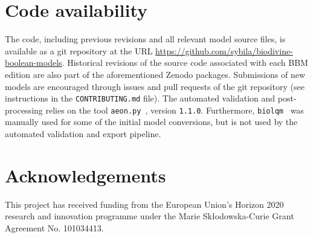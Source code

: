\documentclass[fleqn,10pt]{wlscirep}
\begin{document}
\section*{Code availability}

The code, including previous revisions and all relevant model source files, is available as a git repository at the URL \hyperlink{https://github.com/sybila/biodivine-boolean-models}{https://github.com/sybila/biodivine-boolean-models}. Historical revisions of the source code associated with each BBM edition are also part of the aforementioned Zenodo packages. Submissions of new models are encouraged through issues and pull requests of the git repository (see instructions in the \texttt{CONTRIBUTING.md} file). The automated validation and post-processing relies on the tool \texttt{aeon.py}~\cite{aeonpy}, version \texttt{1.1.0}. Furthermore, \texttt{biolqm}~\cite{biolqm} was manually used for some of the initial model conversions, but is not used by the automated validation and export pipeline.




\section*{Acknowledgements}

This project has received funding from the European Union’s Horizon 2020 research and innovation programme under the Marie Skłodowska-Curie Grant Agreement No. 101034413.

\end{document}
